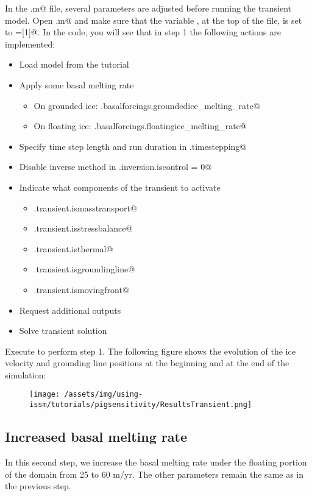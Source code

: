 In the \verb@runme.m@ file, several parameters are adjusted before running the transient model. Open \verb@runme.m@ and make sure that the variable \verb@steps@, at the top of the file, is set to \verb@steps=[1]@. In the code, you will see that in step 1 the following actions are implemented:
\begin{itemize}
	\item Load model from the \verb@Pig@ tutorial
	\item Apply some basal melting rate
		\begin{itemize}
			\item On grounded ice: \verb@md.basalforcings.groundedice_melting_rate@
			\item On floating ice: \verb@md.basalforcings.floatingice_melting_rate@
		\end{itemize}
	\item Specify time step length and run duration in \verb@md.timestepping@
	\item Disable inverse method in \verb@md.inversion.iscontrol = 0@
	\item Indicate what components of the transient to activate
		\begin{itemize}
			\item \verb@md.transient.ismasstransport@
			\item \verb@md.transient.isstressbalance@
			\item \verb@md.transient.isthermal@
			\item \verb@md.transient.isgroundingline@
			\item \verb@md.transient.ismovingfront@
		\end{itemize}
	\item Request additional outputs
	\item Solve transient solution
\end{itemize}

Execute \verb@runme@ to perform step 1. The following figure shows the evolution of the ice velocity and grounding line positions at the beginning and at the end of the simulation:
\begin{figure}[H]
	\begin{center}
		\texttt{[image: /assets/img/using-issm/tutorials/pigsensitivity/ResultsTransient.png]}
	\end{center}
\end{figure}
\subsection{Increased basal melting rate}%
In this second step, we increase the basal melting rate under the floating portion of the domain from 25 to 60 m/yr. The other parameters remain the same as in the previous step.

